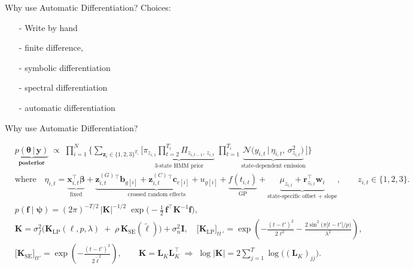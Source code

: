 \documentclass[dvipsnames]{beamer}
\begin{document}
\begin{frame}{Why use Automatic Differentiation?}
Choices:
    \begin{itemize}
        \item[-] Write by hand
        \item[-] finite difference,
        \item[-] symbolic differentiation
        \item[-] spectral differentiation
        \item[-] automatic differentiation
    \end{itemize}
\end{frame}


\begin{frame}{Why use Automatic Differentiation?}

\tiny
\begin{align*}
&\underbrace{p\!\left(
\boldsymbol{\theta} \,\big|\, \mathbf y
\right)}_{\textbf{posterior}}
\;\propto\;
\prod_{i=1}^{N}
\Bigg\{
\sum_{\mathbf z_i \in \{1,2,3\}^{T_i}}
\!\Bigg[
\underbrace{\pi_{z_{i,1}}\prod_{t=2}^{T_i}\Pi_{z_{i,t-1},\,z_{i,t}}}_{\text{3-state HMM prior}}
\;
\prod_{t=1}^{T_i}
\underbrace{\mathcal N\!\Big(
y_{i,t}\,\Big|\,\eta_{i,t},\,\sigma_{z_{i,t}}^{2}
\Big)}_{\text{state-dependent emission}}
\Bigg]
\Bigg\}
\\[-2pt]
&\text{where}\quad
\eta_{i,t}
=\underbrace{\mathbf x_{i,t}^{\!\top}\boldsymbol\beta}_{\text{fixed}}
+\underbrace{\mathbf z^{(G)}_{i,t}{}^{\!\top}\mathbf b_{g[i]}
+\mathbf z^{(C)}_{i,t}{}^{\!\top}\mathbf c_{c[i]}
+u_{g[i]}}_{\text{crossed random effects}}
+\underbrace{f(t_{i,t})}_{\text{GP}}
+\underbrace{\mu_{z_{i,t}}
+\mathbf r_{z_{i,t}}^{\!\top}\mathbf w_i}_{\text{state-specific offset + slope}}
,\qquad z_{i,t}\in\{1,2,3\}.
\\[4pt]
&
p(\mathbf f\mid\boldsymbol\psi)
=
(2\pi)^{-T/2}\,|\mathbf K|^{-1/2}\;
\exp\!\Big(-\tfrac12\,\mathbf f^{\!\top}\mathbf K^{-1}\mathbf f\Big),
\\[-2pt]
&
\mathbf K
=\sigma_f^{2}\Big(\mathbf K_{\text{LP}}(\ell,p,\lambda)\;+\;\rho\,\mathbf K_{\text{SE}}(\tilde\ell)\Big)
+\sigma_n^{2}\mathbf I,\quad
\big[\mathbf K_{\text{LP}}\big]_{t t\,'}
=\exp\!\left(
-\frac{(t-t')^{2}}{2\ell^{2}}
-\frac{2\sin^{2}\!\big(\pi|t-t'|/p\big)}{\lambda^{2}}
\right),
\\[-2pt]
&
\big[\mathbf K_{\text{SE}}\big]_{t t'}
=
\exp\!\left(-\frac{(t-t')^{2}}{2\tilde\ell^{2}}\right),
\qquad
\mathbf K=\mathbf L_K\mathbf L_K^{\!\top}
\;\Rightarrow\;
\log|\mathbf K|=2\sum_{j=1}^{T}\log \big((\mathbf L_K)_{jj}\big).

\end{align*}
\end{frame}
\end{document}
